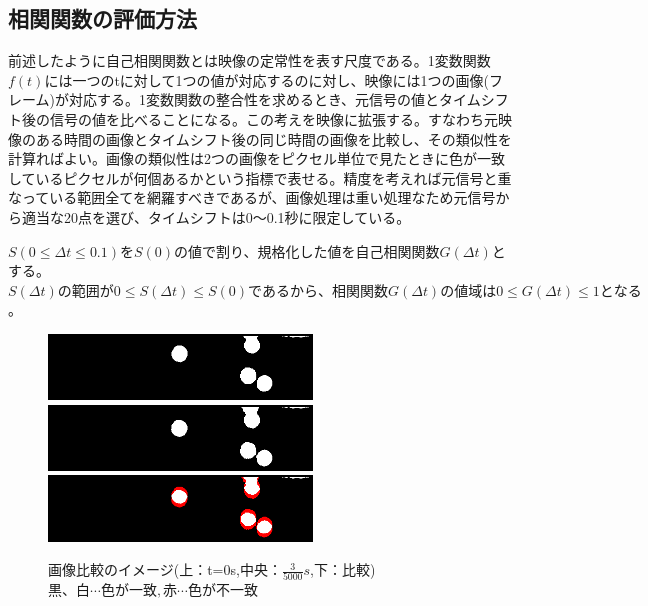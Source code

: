\documentclass[a4j,12pt,dvipdfmx]{jsarticle}
\begin{document}
\subsection{相関関数の評価方法}
前述したように自己相関関数とは映像の定常性を表す尺度である。1変数関数$f(t)$には一つのtに対して1つの値が対応するのに対し、映像には1つの画像(フレーム)が対応する。1変数関数の整合性を求めるとき、元信号の値とタイムシフト後の信号の値を比べることになる。この考えを映像に拡張する。すなわち元映像のある時間の画像とタイムシフト後の同じ時間の画像を比較し、その類似性を計算ればよい。画像の類似性は2つの画像をピクセル単位で見たときに色が一致しているピクセルが何個あるかという指標で表せる。精度を考えれば元信号と重なっている範囲全てを網羅すべきであるが、画像処理は重い処理なため元信号から適当な20点を選び、タイムシフトは0〜0.1秒に限定している。

$S(0 \leq \Delta t \leq 0.1)をS(0)$の値で割り、規格化した値を自己相関関数$G(\Delta t)$とする。$S(\Delta t)の範囲が0 \leq S(\Delta t) \leq S(0)であるから、相関関数G(\Delta t)の値域は0 \leq G(\Delta t) \leq 1となる$。
\begin{figure}[hbtp]
	\includegraphics[clip,width=7.0cm]{0.png}
	\includegraphics[clip,width=7.0cm]{3.png}
	\includegraphics[clip,width=7.0cm]{0and3.png}
	\caption{画像比較のイメージ(上：t=0s,中央：$\frac{3}{5000}s$,下：比較) \newline $黒、白 \cdots 色が一致 ,赤 \cdots 色が不一致$}
	\label{fig:exfall}
\end{figure}
\end{document}
